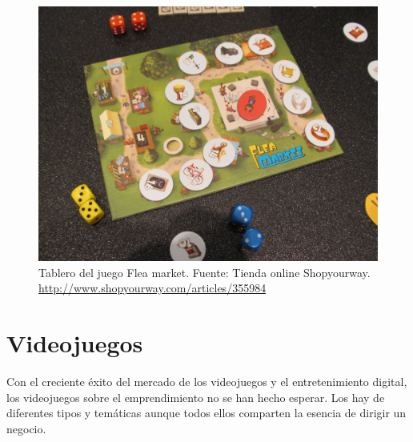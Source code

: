 \begin{description}
\begin{figure}
\begin{center}
\includegraphics[scale=0.4]{imagenes/fleaMarket.jpg}
\caption{Tablero del juego Flea market.  Fuente: Tienda online Shopyourway. \url{http://www.shopyourway.com/articles/355984}}
\label{fleaMarket}
\end{center}
\end{figure}
\end{description}

\section{Videojuegos}

Con el creciente éxito del mercado de los videojuegos y el entretenimiento digital, los videojuegos sobre el emprendimiento no se han hecho esperar. Los hay de diferentes tipos y temáticas aunque todos ellos comparten la esencia de dirigir un negocio.

